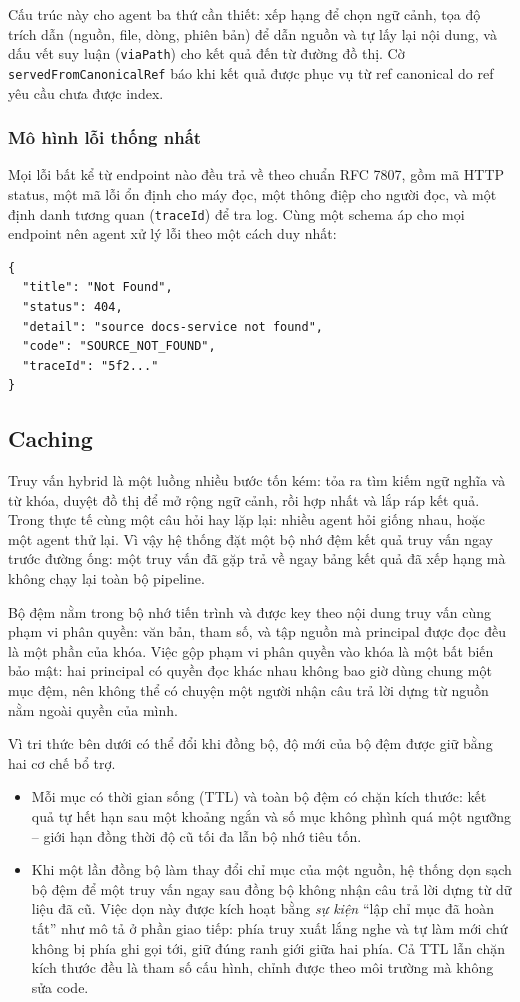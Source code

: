 Cấu trúc này cho agent ba thứ cần thiết: xếp hạng để chọn ngữ cảnh, tọa độ trích dẫn (nguồn, file, dòng, phiên bản) để dẫn nguồn và tự lấy lại nội dung, và dấu vết suy luận (\texttt{viaPath}) cho kết quả đến từ đường đồ thị. Cờ \texttt{servedFromCanonicalRef} báo khi kết quả được phục vụ từ ref canonical do ref yêu cầu chưa được index.

\subsubsection{Mô hình lỗi thống nhất}

Mọi lỗi bất kể từ endpoint nào đều trả về theo chuẩn RFC 7807, gồm mã HTTP status, một mã lỗi ổn định cho máy đọc, một thông điệp cho người đọc, và một định danh tương quan (\texttt{traceId}) để tra log. Cùng một schema áp cho mọi endpoint nên agent xử lý lỗi theo một cách duy nhất:

\begin{lstlisting}
{
  "title": "Not Found",
  "status": 404,
  "detail": "source docs-service not found",
  "code": "SOURCE_NOT_FOUND",
  "traceId": "5f2..."
}
\end{lstlisting}

\subsection{Caching}

Truy vấn hybrid là một luồng nhiều bước tốn kém: tỏa ra tìm kiếm ngữ nghĩa và từ khóa, duyệt đồ thị để mở rộng ngữ cảnh, rồi hợp nhất và lắp ráp kết quả. Trong thực tế cùng một câu hỏi hay lặp lại: nhiều agent hỏi giống nhau, hoặc một agent thử lại. Vì vậy hệ thống đặt một bộ nhớ đệm kết quả truy vấn ngay trước đường ống: một truy vấn đã gặp trả về ngay bảng kết quả đã xếp hạng mà không chạy lại toàn bộ pipeline.

Bộ đệm nằm trong bộ nhớ tiến trình và được key theo nội dung truy vấn cùng phạm vi phân quyền: văn bản, tham số, và tập nguồn mà principal được đọc đều là một phần của khóa. Việc gộp phạm vi phân quyền vào khóa là một bất biến bảo mật: hai principal có quyền đọc khác nhau không bao giờ dùng chung một mục đệm, nên không thể có chuyện một người nhận câu trả lời dựng từ nguồn nằm ngoài quyền của mình.

Vì tri thức bên dưới có thể đổi khi đồng bộ, độ mới của bộ đệm được giữ bằng hai cơ chế bổ trợ. 
\begin{itemize} 
  \item Mỗi mục có thời gian sống (TTL) và toàn bộ đệm có chặn kích thước: kết quả tự hết hạn sau một khoảng ngắn và số mục không phình quá một ngưỡng -- giới hạn đồng thời độ cũ tối đa lẫn bộ nhớ tiêu tốn. 
  \item Khi một lần đồng bộ làm thay đổi chỉ mục của một nguồn, hệ thống dọn sạch bộ đệm để một truy vấn ngay sau đồng bộ không nhận câu trả lời dựng từ dữ liệu đã cũ. Việc dọn này được kích hoạt bằng \textit{sự kiện} ``lập chỉ mục đã hoàn tất'' như mô tả ở phần giao tiếp: phía truy xuất lắng nghe và tự làm mới chứ không bị phía ghi gọi tới, giữ đúng ranh giới giữa hai phía. Cả TTL lẫn chặn kích thước đều là tham số cấu hình, chỉnh được theo môi trường mà không sửa code.
\end{itemize}

